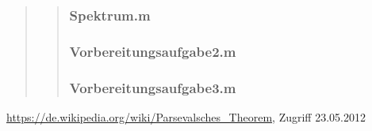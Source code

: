 \begin{quote}
\begin{quote}
		\subsubsection{Spektrum.m}
		\begin{quote}
		
				
		\end{quote}
		
		\subsubsection{Vorbereitungsaufgabe2.m}
		\begin{quote}
		
		
		\end{quote}
		
		\subsubsection{Vorbereitungsaufgabe3.m}
		\begin{quote}
		
		
		\end{quote}
		
	\end{quote}
\end{quote}



\begin{thebibliography}{999}

 \url{https://de.wikipedia.org/wiki/Parsevalsches_Theorem}, Zugriff
23.05.2012
\end{thebibliography}





